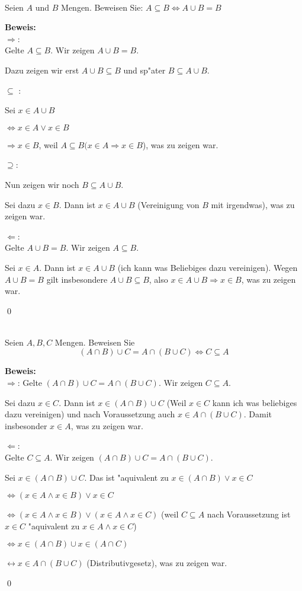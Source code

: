 \\
Seien $A$ und $B$ Mengen. Beweisen Sie:
$A\subseteq B\Leftrightarrow A\cup B=B$

\begin{loesung}
\textbf{Beweis:}\\
\glqq $\Rightarrow$\grqq :\\
Gelte $A\subseteq B$. Wir zeigen $A\cup B=B$.

Dazu zeigen wir erst $A\cup B\subseteq B$ und sp"ater $B\subseteq A\cup B$.

\glqq $\subseteq$ \grqq:

Sei $x\in A\cup B$

$\Leftrightarrow x\in A\vee x\in B$

$\Rightarrow x\in B$, weil $A\subseteq B (x\in A\Rightarrow x\in B$), was zu zeigen war.

\glqq$\supseteq$\grqq:

Nun zeigen wir noch $B\subseteq A\cup B$. 

Sei dazu $x\in B$. Dann ist $x\in A\cup B$ (Vereinigung von $B$ mit irgendwas), was zu zeigen war.

\glqq$\Leftarrow$\grqq:\\
Gelte $A\cup B=B$. Wir zeigen $A\subseteq B$.

Sei $x\in A$. Dann ist $x\in A\cup B$ (ich kann was Beliebiges dazu vereinigen). Wegen $A\cup B=B$ gilt insbesondere $A\cup B\subseteq B$, also $x\in A\cup B\Rightarrow x\in B$, was zu zeigen war.

\qed

\end{loesung}


\\
Seien $A,B,C$ Mengen. Beweisen Sie \[(A\cap B)\cup C=A\cap (B\cup C)\Leftrightarrow C\subseteq A\]

\begin{loesung}
  \textbf{Beweis:}\\
\glqq $\Rightarrow$\grqq: Gelte $(A\cap B)\cup C=A\cap(B\cup C)$. Wir zeigen $C\subseteq A$.

Sei dazu $x\in C$. Dann ist $x\in (A\cap B)\cup C$ (Weil $x\in C$ kann ich was beliebiges dazu vereinigen) und nach Voraussetzung auch 
$x\in A\cap (B\cup C)$. Damit insbesonder $x\in A$, was zu zeigen war.

\glqq $\Leftarrow$\grqq:\\
Gelte $C\subseteq A$. Wir zeigen $(A\cap B)\cup C=A\cap(B\cup C)$.

Sei $x\in (A\cap B)\cup C$. Das ist "aquivalent zu $x\in (A\cap B)\vee x\in C$

$\Leftrightarrow (x\in A\wedge x\in B)\vee x\in C$

$\Leftrightarrow (x\in A\wedge x\in B)\vee (x\in A\wedge x\in C)$ (weil $C\subseteq A$ nach Voraussetzung ist $x\in C$ "aquivalent zu $x\in A\wedge x\in C$)

$\Leftrightarrow x\in (A\cap B)\cup x\in (A\cap C)$

$\leftrightarrow x\in A\cap(B\cup C)$ (Distributivgesetz), was zu zeigen war.

\qed

\end{loesung}
